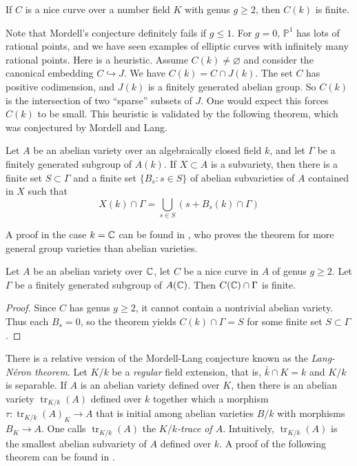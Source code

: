 \documentclass{article}
\begin{document}
\begin{theorem}[Faltings]
If $C$ is a nice curve over a number field $K$ with genus $g\geqslant 2$, then 
$C(k)$ is finite.
\end{theorem}

Note that Mordell's conjecture definitely fails if $g\leqslant 1$. For $g=0$, 
$\mathbb{P}^1$ has lots of rational points, and we have seen examples of 
elliptic curves with infinitely many rational points. Here is a heuristic. 
Assume $C(k)\ne\varnothing$ and consider the canonical embedding 
$C\hookrightarrow J$. We have $C(k)=C\cap J(k)$. The set $C$ has positive 
codimension, and $J(k)$ is a finitely generated abelian group. So 
$C(k)$ is the intersection of two ``sparse'' subsets of $J$. One would expect 
this forces $C(k)$ to be small. This heuristic is validated by the following 
theorem, which was conjectured by Mordell and Lang.

\begin{theorem}[Faltings]
Let $A$ be an abelian variety over an algebraically closed field $k$, and let 
$\Gamma$ be a finitely generated subgroup of $A(k)$. If $X\subset A$ is a 
subvariety, then there is a finite set $S\subset \Gamma$ and a finite set 
$\{B_s:s\in S\}$ of abelian subvarieties of $A$ contained in $X$ such that 
\[
  X(k)\cap \Gamma = \bigcup_{s\in S} \left(s+ B_s(k)\cap \Gamma\right)
\]
\end{theorem}
A proof in the case $k=\mathbb{C}$ can be found in \cite{mc95}, who proves the theorem 
for more general group varieties than abelian varieties. 

\begin{corollary}
Let $A$ be an abelian variety over $\mathbb{C}$, let $C$ be a nice curve in $A$ of 
genus $g\geqslant 2$. Let $\Gamma$ be a finitely generated subgroup of 
$A(\mathbb{C})$. Then $C(\mathbb{C})\cap \Gamma$ is finite. 
\end{corollary}
\begin{proof}
Since $C$ has genus $g\geqslant 2$, it cannot contain a nontrivial abelian 
variety. Thus each $B_s = 0$, so the theorem yields $C(k)\cap \Gamma = S$ 
for some finite set $S\subset \Gamma$. 
\end{proof}

There is a relative version of the Mordell-Lang conjecture known as the 
\emph{Lang-N\'eron theorem}. Let $K/k$ be a \emph{regular} field extension, 
that is, $\bar k\cap K = k$ and $K/k$ is separable. If $A$ is an abelian 
variety defined over $K$, then there is an abelian variety 
$\operatorname{tr}_{K/k}(A)$ defined over $k$ together which a morphism 
$\tau:\operatorname{tr}_{K/k}(A)_K\to A$ that is initial among abelian 
varieties $B/k$ with morphisms $B_K\to A$. One calls 
$\operatorname{tr}_{K/k}(A)$ the \emph{$K/k$-trace of $A$}. Intuitively, 
$\operatorname{tr}_{K/k}(A)$ is the smallest abelian subvariety of $A$ defined 
over $k$. A proof of the following theorem can be found in \cite{co06}. 
\end{document}
